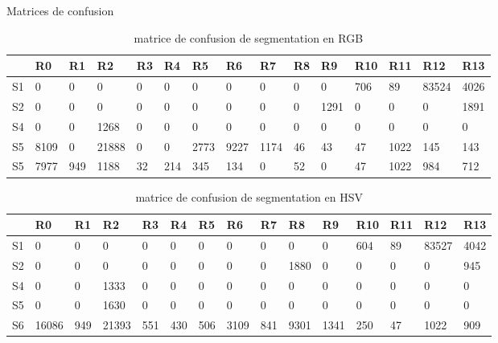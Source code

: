 \documentclass[article=a4, fontsize=11pt]{scrartcl}	%
\begin{document}
\clearpage
\Huge{Matrices de confusion}\normalsize
\begin{table}[!ht]
	\begin{center}
	    \begin{tabular}{| l | l | l | l | l | l | l | l | l | l | l | l | l | l | l |}
	    	\hline
	    	  & R0 & R1 & R2 & R3 & R4 & R5 & R6 & R7 & R8 & R9 & R10 & R11 & R12 & R13\\
	    	\hline
	    	S1 & 0 & 0 & 0 & 0 & 0 & 0 & 0  & 0 & 0 & 0 & 706 & 89 & 83524 & 4026 \\
	    	\hline
	    	S2 & 0 & 0 & 0 & 0 & 0 & 0  & 0 & 0 & 0 & 1291 & 0 & 0 & 0 & 1891 \\
	    	\hline
	    	S4 & 0 & 0 & 1268 & 0 & 0  & 0 & 0 & 0 & 0 & 0 & 0 & 0 & 0 & 0\\
	    	\hline	    	
	    	S5 & 8109 & 0 & 21888 & 0 & 0  & 2773 & 9227 & 1174 & 46 & 43& 47 & 1022 & 145 & 143\\
	    	\hline	    	
	    	S5 & 7977 & 949 & 1188 & 32 & 214  & 345 & 134 & 0 & 52 & 0& 47 & 1022 & 984 & 712\\
	    	\hline	    	
	    \end{tabular}
	\end{center}
	\caption {matrice de confusion de segmentation en RGB}
\end{table}

\begin{table}[!ht]
	\begin{center}
	    \begin{tabular}{| l | l | l | l | l | l | l | l | l | l | l | l | l | l | l |}
	    	\hline
	    	  & R0 & R1 & R2 & R3 & R4 & R5 & R6 & R7 & R8 & R9 & R10 & R11 & R12 & R13\\
	    	\hline
	    	S1 & 0 & 0 & 0 & 0 & 0 & 0 & 0  & 0 & 0 & 0 & 604 & 89 & 83527 & 4042 \\
	    	\hline
	    	S2 & 0 & 0 & 0 & 0 & 0 & 0  & 0 & 0 & 1880 & 0 & 0 & 0 & 0 & 945 \\
	    	\hline
	    	S4 & 0 & 0 & 1333 & 0 & 0  & 0 & 0 & 0 & 0 & 0 & 0 & 0 & 0 & 0\\
	    	\hline
	    	S5 & 0 & 0 & 1630 & 0 & 0 & 0 & 0 & 0 & 0 & 0 & 0 & 0 & 0 & 0\\
	    	\hline	    	
	    	S6 & 16086 & 949 & 21393 & 551 & 430  & 506 & 3109 & 841 & 9301 & 1341  & 250 & 47 & 1022 & 909\\
	    	\hline	    	
	    \end{tabular}
	\end{center}
	\caption {matrice de confusion de segmentation en HSV}
\end{table}
\end{document}
